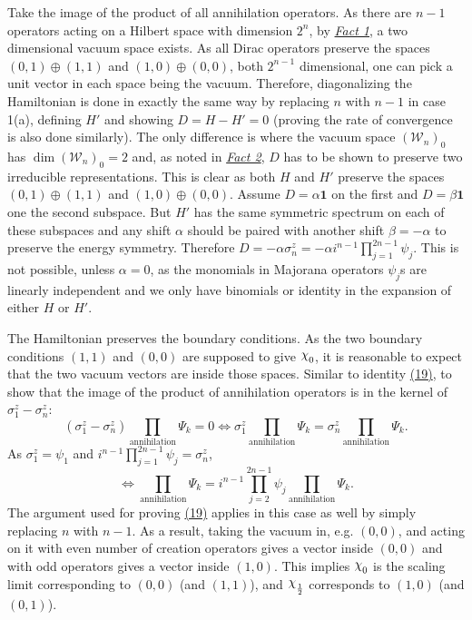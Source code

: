\documentclass[twoside,11pt,titlepage]{amsart}
\renewcommand{\=}[1]{\stackrel{#1}{=}} %
\theoremstyle{definition}
\theoremstyle{remark}
\DeclareRobustCommand{\rchi}{{\mathpalette\irchi\relax}}
\newcommand{\irchi}[2]{\raisebox{\depth}{$#1\chi$}}
\begin{document}
Take the image of the product of all annihilation operators. As there are $n-1$ operators acting on a Hilbert space with dimension $2^{n}$, by \hyperref[fct1]{\textit{Fact 1}}, a two dimensional vacuum space exists. As all Dirac operators preserve the spaces $(0,1) \oplus (1,1)$ and $(1,0) \oplus (0,0)$, both $2^{n-1}$ dimensional, one can pick a unit vector in each space being the vacuum. Therefore, diagonalizing the Hamiltonian is done in exactly the same way by replacing $n$ with $n-1$ in case 1(a), defining $H'$ and showing $D=H-H'=0$ (proving the rate of convergence is also done similarly). The only difference is where the vacuum space $(\mathcal{W}_n)_0$ has $\dim (\mathcal{W}_n)_0=2$ and, as noted in \hyperref[fct2]{\textit{Fact 2}}, $D$ has to be shown to preserve two irreducible representations. This is clear as both $H$ and $H'$ preserve the spaces $(0,1) \oplus (1,1)$ and $(1,0) \oplus (0,0)$. Assume $D=\alpha\textbf{1}$ on the first and $D=\beta \textbf{1}$ one the second subspace. But $H'$ has the same symmetric spectrum on each of these subspaces and any shift $\alpha$ should be paired with another shift $\beta=-\alpha$ to preserve the energy symmetry. Therefore $D=-\alpha\sigma_n^z=-\alpha i^{n-1} \prod_{j=1}^{2n-1}\psi_j$. This is not possible, unless $\alpha=0$, as the monomials in Majorana operators $\psi_j$s are linearly independent and we only have binomials or identity in the expansion of either $H$ or $H'$.

The Hamiltonian preserves the boundary conditions. As the two boundary conditions $(1,1)$ and $(0,0)$ are supposed to give $\rchi_0$, it is reasonable to expect that the two vacuum vectors are inside those spaces. Similar to identity \hyperref[eq19]{(19)}, to show that the image of the product of annihilation operators is in the kernel of $\sigma_1^z-\sigma_n^z$:
$$(\sigma_1^z-\sigma_n^z)\prod_{\text{annihilation}} \Psi_k=0 \Leftrightarrow \sigma_1^z\prod_{\text{annihilation}} \Psi_k = \sigma_n^z \prod_{\text{annihilation}} \Psi_k.$$
As $\sigma_1^z=\psi_1$ and $i^{n-1} \prod_{j=1}^{2n-1}\psi_j=\sigma_n^z$,
$$\Leftrightarrow \prod_{\text{annihilation}} \Psi_k = i^{n-1} \prod_{j=2}^{2n-1}\psi_j \prod_{\text{annihilation}} \Psi_k.$$
The argument used for proving \hyperref[eq19]{(19)} applies in this case as well by simply replacing $n$ with $n-1$. As a result, taking the vacuum in, e.g. $(0,0)$, and acting on it with even number of creation operators gives a vector inside $(0,0)$ and with odd operators gives a vector inside $(1,0)$. This implies $\rchi_0$ is the scaling limit corresponding to $(0,0)$ (and $(1,1)$), and $\rchi_{\frac{1}{2}}$ corresponds to $(1,0)$ (and $(0,1)$). 
\end{document}
